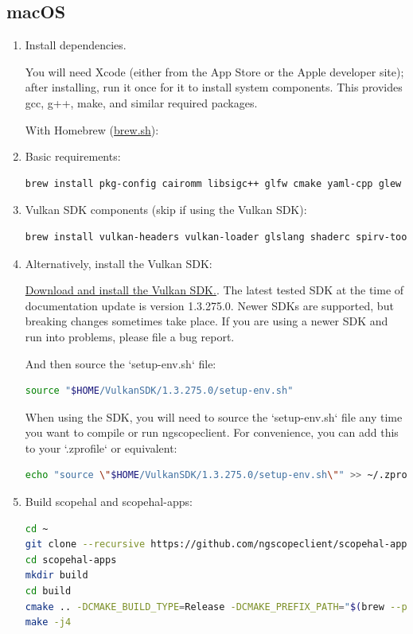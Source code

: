 \subsection{macOS}
\begin{enumerate}

\item Install dependencies.

You will need Xcode (either from the App Store or the Apple developer site); after installing, run it once for it
to install system components. This provides gcc, g++, make, and similar required packages.

With Homebrew (\href{https://brew.sh}{brew.sh}):

\item Basic requirements:
\begin{lstlisting}[language=sh, numbers=none]
brew install pkg-config cairomm libsigc++ glfw cmake yaml-cpp glew catch2 libomp
\end{lstlisting}

\item Vulkan SDK components (skip if using the Vulkan SDK):
\begin{lstlisting}[language=sh, numbers=none]
brew install vulkan-headers vulkan-loader glslang shaderc spirv-tools molten-vk
\end{lstlisting}

\item Alternatively, install the Vulkan SDK:

 \href{https://vulkan.lunarg.com/sdk/home}{Download and install the Vulkan SDK.}.
The latest tested SDK at the time of documentation update is version 1.3.275.0. Newer SDKs are supported, but breaking
changes sometimes take place.
If you are using a newer SDK and run into problems, please file a bug report.

And then source the `setup-env.sh` file:
\begin{lstlisting}[language=sh, numbers=none]
source "$HOME/VulkanSDK/1.3.275.0/setup-env.sh"
\end{lstlisting}

When using the SDK, you will need to source the `setup-env.sh` file any time you want to compile or run ngscopeclient.
For convenience, you can add this to your `.zprofile` or equivalent:
\begin{lstlisting}[language=sh, numbers=none]
echo "source \"$HOME/VulkanSDK/1.3.275.0/setup-env.sh\"" >> ~/.zprofile
\end{lstlisting}

\item Build scopehal and scopehal-apps:

\begin{lstlisting}[language=sh, numbers=none]
cd ~
git clone --recursive https://github.com/ngscopeclient/scopehal-apps.git
cd scopehal-apps
mkdir build
cd build
cmake .. -DCMAKE_BUILD_TYPE=Release -DCMAKE_PREFIX_PATH="$(brew --prefix);$(brew --prefix)/opt/libomp"
make -j4
\end{lstlisting}

\end{enumerate}

